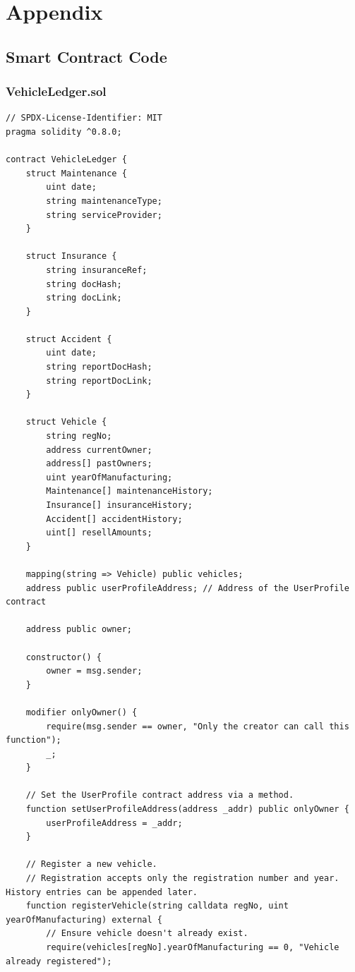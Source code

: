 \documentclass[12pt,a4paper]{article}
\begin{document}
    \section{Appendix}

    \subsection{Smart Contract Code}
    \label{app:contracts}

    \subsubsection{VehicleLedger.sol}
    \begin{verbatim}
// SPDX-License-Identifier: MIT
pragma solidity ^0.8.0;

contract VehicleLedger {
    struct Maintenance {
        uint date;
        string maintenanceType;
        string serviceProvider;
    }

    struct Insurance {
        string insuranceRef;
        string docHash;
        string docLink;
    }

    struct Accident {
        uint date;
        string reportDocHash;
        string reportDocLink;
    }

    struct Vehicle {
        string regNo;
        address currentOwner;
        address[] pastOwners;
        uint yearOfManufacturing;
        Maintenance[] maintenanceHistory;
        Insurance[] insuranceHistory;
        Accident[] accidentHistory;
        uint[] resellAmounts;
    }

    mapping(string => Vehicle) public vehicles;
    address public userProfileAddress; // Address of the UserProfile contract

    address public owner;

    constructor() {
        owner = msg.sender;
    }

    modifier onlyOwner() {
        require(msg.sender == owner, "Only the creator can call this function");
        _;
    }

    // Set the UserProfile contract address via a method.
    function setUserProfileAddress(address _addr) public onlyOwner {
        userProfileAddress = _addr;
    }

    // Register a new vehicle.
    // Registration accepts only the registration number and year. History entries can be appended later.
    function registerVehicle(string calldata regNo, uint yearOfManufacturing) external {
        // Ensure vehicle doesn't already exist.
        require(vehicles[regNo].yearOfManufacturing == 0, "Vehicle already registered");


\end{verbatim}
\end{document}
